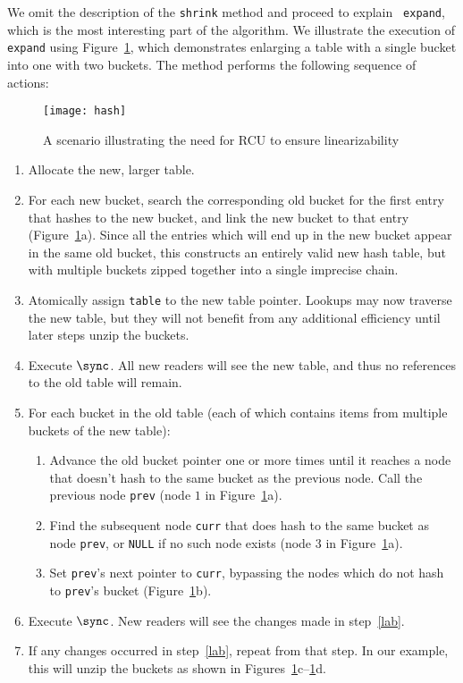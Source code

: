 We omit the description of the {\tt shrink} method and proceed to explain {\tt
  expand}, which is the most interesting part of the algorithm. We illustrate
the execution of {\tt expand} using Figure~\ref{fig:cex}, which demonstrates
enlarging a table with a single bucket into one with two buckets.  The method
performs the following sequence of actions:
\begin{figure}[t]
\texttt{[image: hash]}
\caption{A scenario illustrating the need for RCU to ensure linearizability}
\label{fig:cex}
\end{figure}
\begin{enumerate}
\item Allocate the new, larger table.
\item For each new bucket, search the corresponding old bucket for the first
  entry that hashes to the new bucket, and link the new bucket to that entry
  (Figure~\ref{fig:cex}a). Since all the entries which will end up in the new
  bucket appear in the same old bucket, this constructs an entirely valid new
  hash table, but with multiple buckets zipped together into a single imprecise
  chain.
\item Atomically assign {\tt table} to the new table pointer.  Lookups may now
  traverse the new table, but they will not benefit from any additional
  efficiency until later steps unzip the buckets.
\item Execute $\sync$. All new readers will see the new table, and thus no
  references to the old table will remain.
\item \label{lab} For each bucket in the old table (each of which contains items
  from multiple buckets of the new table):
\begin{enumerate}
\item Advance the old bucket pointer one or more times until it reaches a node
  that doesn't hash to the same bucket as the previous node. Call the previous
  node {\tt prev} (node $1$ in Figure~\ref{fig:cex}a).
\item Find the subsequent node {\tt curr} that does hash to the same bucket as
  node {\tt prev}, or {\tt NULL} if no such node exists (node $3$ in
  Figure~\ref{fig:cex}a).
\item Set {\tt prev}'s next pointer to {\tt curr}, bypassing the nodes which do
  not hash to {\tt prev}'s bucket (Figure~\ref{fig:cex}b).
\end{enumerate}
\item \label{lab2} Execute $\sync$. New readers will see the changes made in
  step~\ref{lab}.
\item If any changes occurred in step~\ref{lab}, repeat from that step.
In our example, this will unzip the buckets as shown in
Figures~\ref{fig:cex}c--\ref{fig:cex}d. 
\end{enumerate}
